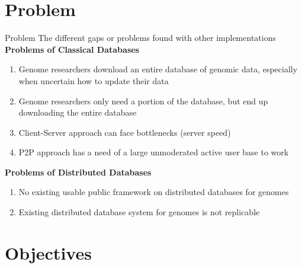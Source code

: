 \documentclass{beamer}
\begin{document}
\section{Problem}
\begin{frame}{Problem}
    The different gaps or problems found with other implementations
    \textbf{Problems of Classical Databases}
    \begin{enumerate}
        \item Genome researchers download an entire database of genomic data, especially when uncertain how to update their data
        \item Genome researchers only need a portion of the database, but end up downloading the entire database
        \item Client-Server approach can face bottlenecks (server speed)
        \item P2P approach has a need of a large unmoderated active user base to work
    \end{enumerate}
    \textbf{Problems of Distributed Databases}
    
    \begin{enumerate}
        \item No existing usable public framework on distributed databases for genomes
        \item Existing distributed database system for genomes is not replicable
    \end{enumerate}
\end{frame}

\begin{frame}
\titlepage %
\end{frame}



\section{Objectives}
\end{document}
